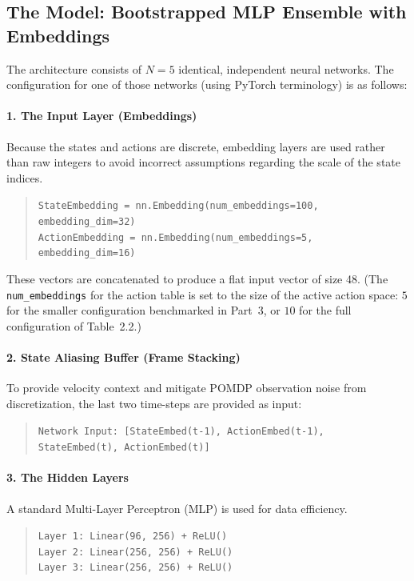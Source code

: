 \documentclass[11pt]{article}
\begin{document}
\subsection*{The Model: Bootstrapped MLP Ensemble with Embeddings}
The architecture consists of $N = 5$ identical, independent neural networks. The configuration for one of those networks (using PyTorch terminology) is as follows:

\paragraph{1. The Input Layer (Embeddings)}
Because the states and actions are discrete, embedding layers are used rather than raw integers to avoid incorrect assumptions regarding the scale of the state indices.
\begin{quote}
    \texttt{StateEmbedding = nn.Embedding(num\_embeddings=100, embedding\_dim=32)}\\
    \texttt{ActionEmbedding = nn.Embedding(num\_embeddings=5, embedding\_dim=16)}
\end{quote}
These vectors are concatenated to produce a flat input vector of size 48. (The
\texttt{num\_embeddings} for the action table is set to the size of the active
action space: $5$ for the smaller configuration benchmarked in Part~3, or $10$ for
the full configuration of Table~2.2.)

\paragraph{2. State Aliasing Buffer (Frame Stacking)}
To provide velocity context and mitigate POMDP observation noise from discretization, the last two time-steps are provided as input:
\begin{quote}
    \texttt{Network Input: [StateEmbed(t-1), ActionEmbed(t-1), StateEmbed(t), ActionEmbed(t)]}
\end{quote}

\paragraph{3. The Hidden Layers}
A standard Multi-Layer Perceptron (MLP) is used for data efficiency.
\begin{quote}
    \texttt{Layer 1: Linear(96, 256) + ReLU()}\\
    \texttt{Layer 2: Linear(256, 256) + ReLU()}\\
    \texttt{Layer 3: Linear(256, 256) + ReLU()}
\end{quote}
\end{document}
